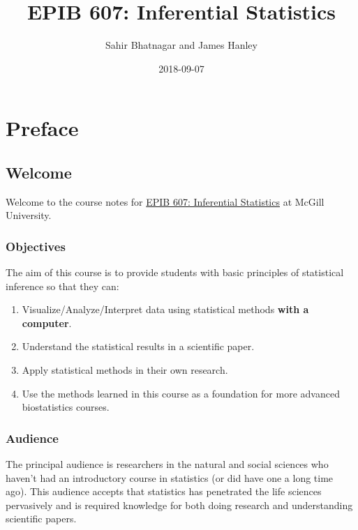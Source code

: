 \documentclass[]{book}
\title{EPIB 607: Inferential Statistics}
\author{Sahir Bhatnagar and James Hanley}
\date{2018-09-07}
\providecommand{\tightlist}{%
  \setlength{\itemsep}{0pt}\setlength{\parskip}{0pt}}
\providecommand{\tightlist}{%
  \setlength{\itemsep}{0pt}\setlength{\parskip}{0pt}}
\theoremstyle{definition}
\theoremstyle{definition}
\theoremstyle{definition}
\theoremstyle{remark}
\begin{document}
\maketitle

{
\setcounter{tocdepth}{1}
\tableofcontents
}
\part{Preface}\label{part-preface}

\chapter{Welcome}\label{welcome}

Welcome to the course notes for
\href{https://www.mcgill.ca/study/2018-2019/courses/epib-607}{EPIB 607:
Inferential Statistics} at McGill University.

\section{Objectives}\label{objectives}

The aim of this course is to provide students with basic principles of
statistical inference so that they can:

\begin{enumerate}
\def\labelenumi{\arabic{enumi}.}
\tightlist
\item
  Visualize/Analyze/Interpret data using statistical methods
  \textbf{with a computer}.
\item
  Understand the statistical results in a scientific paper.\\
\item
  Apply statistical methods in their own research.\\
\item
  Use the methods learned in this course as a foundation for more
  advanced biostatistics courses.
\end{enumerate}

\section{Audience}\label{audience}

The principal audience is researchers in the natural and social sciences
who haven't had an introductory course in statistics (or did have one a
long time ago). This audience accepts that statistics has penetrated the
life sciences pervasively and is required knowledge for both doing
research and understanding scientific papers.
\end{document}
